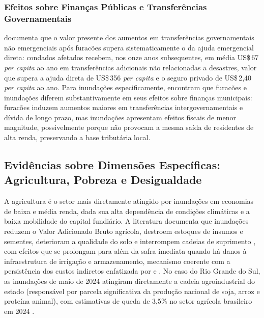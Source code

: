 \documentclass[a4paper,12pt]{article}
\begin{document}
\subsubsection{Efeitos sobre Finanças Públicas e Transferências Governamentais}

 documenta que o valor presente dos aumentos em
transferências governamentais não emergenciais após furacões supera sistematicamente o
da ajuda emergencial direta: condados afetados recebem, nos onze anos subsequentes, em
média US\$\,67 \textit{per capita} ao ano em transferências adicionais não relacionadas a
desastres, valor que supera a ajuda direta de US\$\,356 \textit{per capita} e o seguro
privado de US\$\,2,40 \textit{per capita} ao ano. Para inundações especificamente,
 encontram que furacões e inundações diferem substantivamente em
seus efeitos sobre finanças municipais: furacões induzem aumentos maiores em
transferências intergovernamentais e dívida de longo prazo, mas inundações apresentam
efeitos fiscais de menor magnitude, possivelmente porque não provocam a mesma saída de
residentes de alta renda, preservando a base tributária local.

\subsection{Evidências sobre Dimensões Específicas: Agricultura, Pobreza e
Desigualdade}
\label{sub:agricultura}

A agricultura é o setor mais diretamente atingido por inundações em economias de baixa e
média renda, dada sua alta dependência de condições climáticas e a baixa mobilidade do
capital fundiário.
A literatura documenta que inundações reduzem o Valor Adicionado
Bruto agrícola, destroem estoques de insumos e sementes, deterioram a qualidade do solo
e interrompem cadeias de suprimento \cite{leiter2009, bergholt2012}, com efeitos que se
prolongam para além da safra imediata quando há danos à infraestrutura de irrigação e
armazenamento, mecanismo coerente com a persistência dos custos indiretos enfatizada
por  e .
No caso do Rio Grande do Sul, as inundações de maio de 2024 atingiram diretamente a
cadeia agroindustrial do estado (responsável por parcela significativa da produção
nacional de soja, arroz e proteína animal), com estimativas de queda de 3,5\% no setor
agrícola brasileiro em 2024 \cite{ocha2024}.
\end{document}
